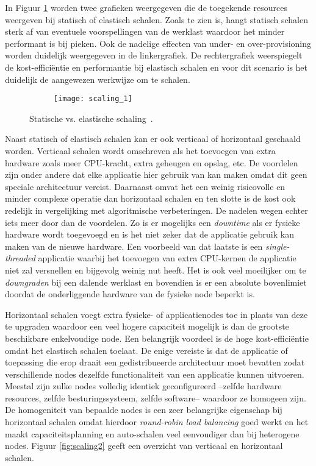 In Figuur \ref{fig:scaling1} worden twee grafieken weergegeven die de toegekende resources weergeven bij statisch of elastisch schalen. Zoals te zien is, hangt statisch schalen sterk af van eventuele voorspellingen van de werklast waardoor het minder performant is bij pieken. Ook de nadelige effecten van under- en over-provisioning worden duidelijk weergegeven in de linkergrafiek. De rechtergrafiek weerspiegelt de kost-efficiëntie en performantie bij elastisch schalen en voor dit scenario is het duidelijk de aangewezen werkwijze om te schalen.


\begin{figure}
	\centering
	\captionsetup{justification=centering}
	\begin{subfigure}{\textwidth}
		\centering
		\centerline{
			\texttt{[image: scaling\_1]}
		}
	\end{subfigure}
	\caption{Statische vs. elastische schaling~\cite{Simoens}.}
	\label{fig:scaling1}
\end{figure}

Naast statisch of elastisch schalen kan er ook verticaal of horizontaal geschaald worden. Verticaal schalen wordt omschreven als het toevoegen van extra hardware zoals meer CPU-kracht, extra geheugen en opslag, etc. De voordelen zijn onder andere dat elke applicatie hier gebruik van kan maken omdat dit geen speciale architectuur vereist. Daarnaast omvat het een weinig risicovolle en minder complexe operatie dan horizontaal schalen en ten slotte is de kost ook redelijk in vergelijking met algoritmische verbeteringen. De nadelen wegen echter iets meer door dan de voordelen. Zo is er mogelijks een \textit{downtime} als er fysieke hardware wordt toegevoegd en is het niet zeker dat de applicatie gebruik kan maken van de nieuwe hardware. Een voorbeeld van dat laatste is een \textit{single-threaded} applicatie waarbij het toevoegen van extra CPU-kernen de applicatie niet zal versnellen en bijgevolg weinig nut heeft. Het is ook veel moeilijker om te \textit{downgraden} bij een dalende werklast en bovendien is er een absolute bovenlimiet doordat de onderliggende hardware van de fysieke node beperkt is.

Horizontaal schalen voegt extra fysieke- of applicatienodes toe in plaats van deze te upgraden waardoor een veel hogere capaciteit mogelijk is dan de grootste beschikbare enkelvoudige node. Een belangrijk voordeel is de hoge kost-efficiëntie omdat het elastisch schalen toelaat. De enige vereiste is dat de applicatie of toepassing die erop draait een gedistribueerde architectuur moet bevatten zodat verschillende nodes dezelfde functionaliteit van een applicatie kunnen uitvoeren. Meestal zijn zulke nodes volledig identiek geconfigureerd --zelfde hardware resources, zelfde besturingssysteem, zelfde software-- waardoor ze homogeen zijn. De homogeniteit van bepaalde nodes is een zeer belangrijke eigenschap bij horizontaal schalen omdat hierdoor \textit{round-robin load balancing} goed werkt en het maakt capaciteitsplanning en auto-schalen veel eenvoudiger dan bij heterogene nodes. Figuur \ref{fig:scaling2} geeft een overzicht van verticaal en horizontaal schalen.


